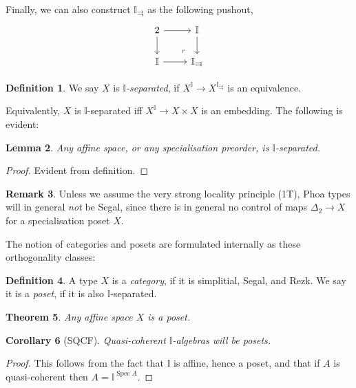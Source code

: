 \documentclass[12pt]{amsart}
\newtheorem{theorem}{Theorem}[section]
\newtheorem{lemma}[theorem]{Lemma}
\newtheorem{corollary}[theorem]{Corollary}
\theoremstyle{definition}
\newtheorem{definition}[theorem]{Definition}
\newtheorem{remark}[theorem]{Remark}
\newcommand{\mbb}[1]{\mathbb{#1}}
\newcommand{\I}{\mbb I}
\newcommand{\spec}{\operatorname{Spec}}
\begin{document}
Finally, we can also construct $\I_{\rightrightarrows}$ as the following pushout,
\[
\begin{tikzcd}
  2 \ar[r] \ar[d] & \I \ar[d] \\ 
  \I \ar[r] & \I_{\rightrightarrows}
  \arrow["\lrcorner"{anchor=center, pos=0.125, rotate=180}, draw=none, from=2-2, to=1-1]
\end{tikzcd}
\]

\begin{definition}
  We say $X$ is \emph{$\I$-separated}, if $X^{\I} \to X^{\I_\rightrightarrows}$ is an equivalence.
\end{definition}

Equivalently, $X$ is $\I$-separated iff $X^\I \to X \times X$ is an embedding. The following is evident:

\begin{lemma}
  Any affine space, or any specialisation preorder, is $\I$-separated.
\end{lemma}
\begin{proof}
  Evident from definition.
\end{proof}

\begin{remark}
  Unless we assume the very strong locality principle (1T), Phoa types will in general \emph{not} be Segal, since there is in general no control of maps $\Delta_2 \to X$ for a specialisation poset $X$.
\end{remark}

The notion of categories and posets are formulated internally as these orthogonality classes:

\begin{definition}
  A type $X$ is a \emph{category}, if it is simplitial, Segal, and Rezk. We say it is a \emph{poset}, if it is also $\I$-separated.
\end{definition}

\begin{theorem}\label{thm:affineposet}
  Any affine space $X$ is a poset.
\end{theorem}

\begin{corollary}[SQCF]
  Quasi-coherent $\I$-algebras will be posets.
\end{corollary}
\begin{proof}
  This follows from the fact that $\I$ is affine, hence a poset, and that if $A$ is quasi-coherent then $A = \I^{\spec A}$.
\end{proof}
\end{document}
